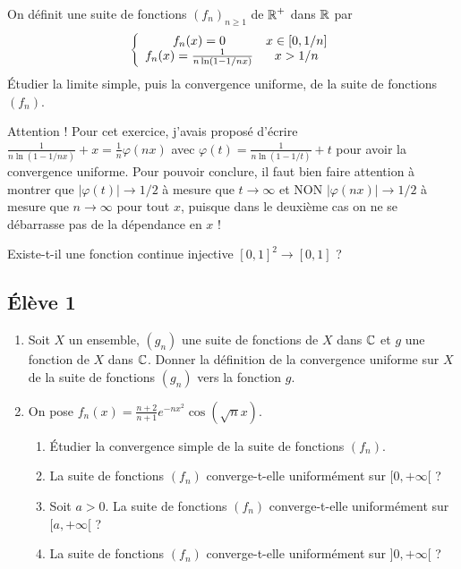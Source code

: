\documentclass[10pt]{scrartcl}
\begin{document}
    \begin{exo}
       On définit une suite de fonctions $(f_n)_{n\geq 1}$ de $\operatorname{\mathbb R}^+$ dans $\operatorname{\mathbb R}$ par 
       \[
            \left\lbrace\begin{array}{c c}f_n(x)=0 & x\in[0,1/n]\\ f_n(x)=\frac1{n\ln(1-1/nx)} & x > 1/n\end{array}\right.
       \]
       Étudier la limite simple, puis la convergence uniforme, de la suite de fonctions $(f_n)$.
    \end{exo}

    \begin{remarks}
        Attention ! Pour cet exercice, j'avais proposé d'écrire $\frac1{n\ln(1-1/nx)}+x=\frac1n\varphi(nx)$ avec $\varphi(t)=\frac1{n\ln(1-1/t)}+t$ pour avoir la convergence uniforme. 
        Pour pouvoir conclure, il faut bien faire attention à montrer que $|\varphi(t)|\to 1/2$ à mesure que $t\to\infty$ et NON $|\varphi(nx)|\to 1/2$ à mesure que $n\to\infty$ pour tout $x$, puisque dans le deuxième cas on ne se débarrasse pas de la dépendance en $x$ !
    \end{remarks}

    \begin{exo}
        Existe-t-il une fonction continue injective $[0,1]^2\to[0,1]$ ?
    \end{exo}

    \subsection*{Élève 1}

    \begin{ccp}\hfill
        \begin{enumerate}
            \item Soit $X$ un ensemble, $(g_n)$ une suite de fonctions de $X$ dans $\operatorname{\mathbb C}$ et $g$ une fonction de $X$ dans $\operatorname{\mathbb C}$. 
            Donner la définition de la convergence uniforme sur $X$ de la suite de fonctions $(g_n)$ vers la fonction $g$. 

            \item On pose $f_n(x)=\frac{n+2}{n+1}e^{-nx^2}\cos(\sqrt{n}x)$.
            \begin{enumerate}
                \item Étudier la convergence simple de la suite de fonctions $(f_n)$.
                \item La suite de fonctions $(f_n)$ converge-t-elle uniformément sur $[0,+\infty[$ ?
                \item Soit $a>0$. La suite de fonctions $(f_n)$ converge-t-elle uniformément sur $[a,+\infty[$ ?
                \item La suite de fonctions $(f_n)$ converge-t-elle uniformément sur $]0,+\infty[$ ?
            \end{enumerate}
        \end{enumerate}
    \end{ccp}
\end{document}
